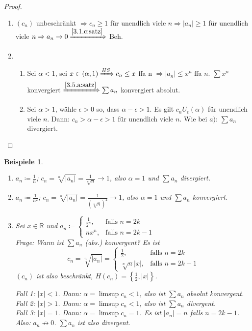 \documentclass[12pt]{extreport} %
\newcommand{\R}{\mathbb{R}}
\theoremstyle{named}
\theoremstyle{dotless}
\newtheorem*{beispiele}{Beispiele}
\begin{document}
\begin{proof} ~\
	\begin{enumerate}
		\item $(c_{n})$ unbeschränkt $\Rightarrow c_{n} \geq 1$ für unendlich viele $n \Rightarrow |a_{n}| \geq 1$ für unendlich viele $n \Rightarrow a_{n} \rightarrow 0 \xRightarrow[]{\ref{3.1.c:satz}}$ Beh.
		\item  
			\begin{enumerate}
				\item Sei $\alpha < 1$, sei $x \in (\alpha, 1) \xRightarrow[]{HS} c_{n} \leq x$ ffa n $\Rightarrow |a_{n}| \leq x^{n}$ ffa $n$. $\sum x^{n}$ konvergiert $\xRightarrow[]{\ref{3.5.a:satz}} \sum a_{n}$ konvergiert absolut. 
				\item Sei $\alpha > 1$, wähle $\epsilon > 0$ so, dass $\alpha - \epsilon > 1$. Es gilt $c_{n} U_{\epsilon}(\alpha)$ für unendlich viele $n$. Dann: $c_{n} > \alpha - \epsilon > 1$ für unendlich viele $n$. Wie bei $a)$: $\sum a_{n}$ divergiert. 
			\end{enumerate}
	\end{enumerate}
\end{proof}


\begin{beispiele} ~\
	\begin{enumerate}
		\item $a_{n} \coloneqq \frac{1}{n}$; $c_{n} = \sqrt[n]{|a_{n}|} = \frac{1}{\sqrt[n]{n}} \rightarrow 1$, also $\alpha = 1$ und $\sum a_{n}$ divergiert.
		\item $a_{n} \coloneqq \frac{1}{n^{2}}$; $c_{n} = \sqrt[n]{|a_{n}|} = \frac{1}{(\sqrt[n]{n})^{2}} \rightarrow 1$, also $\alpha = 1$ und $\sum a_{n}$ konvergiert.
		\item Sei $x \in \R$ und $a_{n} \coloneqq \begin{cases} \frac{1}{2^{n}}, & \text{falls } n = 2k \\ n x^{n}, & \text{falls } n = 2k - 1 \end{cases}$ \\
			Frage: Wann ist $\sum a_{n}$ (abs.) konvergent? Es ist
				$$ c_{n} = \sqrt[n]{|a_{n}|} = \begin{cases} \frac{1}{2}, & \text{falls } n = 2k \\ \sqrt[n]{n}|x|, & \text{falls } n = 2k - 1 \end{cases} $$
			$(c_{n})$ ist also beschränkt, $H(c_{n}) = \left\{ \frac{1}{2}, |x| \right\}$.  
			
			Fall 1: $|x| < 1$. Dann: $\alpha = \limsup c_{n} < 1$, also ist $\sum a_{n}$ absolut konvergent. \\
			Fall 2: $|x| > 1$. Dann: $\alpha = \limsup c_{n} < 1$, also ist $\sum a_{n}$ divergent. \\
			Fall 3: $|x| = 1$. Dann: $\alpha = \limsup c_{n} = 1$. Es ist $|a_{n}| = n$ falls $n = 2k - 1$. Also: $a_{n} \not\rightarrow 0$. $\sum a_{n}$ ist also divergent.			
	\end{enumerate}	
\end{beispiele}
\end{document}
